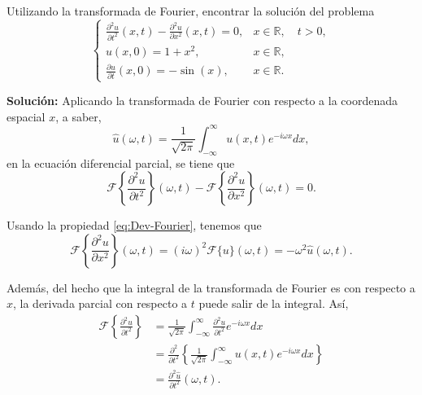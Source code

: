 \begin{ejemplo}
    Utilizando la transformada de Fourier, encontrar la solución del problema
    \begin{equation}
        \left\{ \begin{array}{cl}
           {\displaystyle\frac{\partial^2 u}{\partial t^2}(x,t) - \frac{\partial^2 u}{\partial x^2}(x,t) = 0},  & x \in \mathbb{R}, \quad t > 0,  \\
             u(x,0) = 1 + x^2, & x \in \mathbb{R}, \\
             {\displaystyle\frac{\partial u}{\partial t}(x,0)} = -\sin(x) , & x \in \mathbb{R}.
        \end{array}\right. 
    \end{equation}

    \textbf{Solución:} Aplicando la transformada de Fourier con respecto a la coordenada espacial $x$, a saber,
    \begin{equation}
        \hat{u}(\omega,t) = \frac{1}{\sqrt{2\pi}} \int_{-\infty}^{\infty} u(x,t) e^{-i\omega x} dx,
    \end{equation}
en la ecuación diferencial parcial, se tiene que
\begin{equation}
    \mathcal{F} \left\{ \frac{\partial^2 u}{\partial t^2} \right\}(\omega,t) - \mathcal{F}\left\{  \frac{\partial^2 u}{\partial x^2} \right\}(\omega,t) = 0.  \label{eq:Fourier4} 
\end{equation}

Usando la propiedad \eqref{eq:Dev-Fourier}, tenemos que
\begin{equation}
    \mathcal{F}\left\{\frac{\partial^2 u}{\partial x^2}\right\}(\omega,t) = (i\omega)^2 \mathcal{F}\{u\}(\omega,t) = -\omega^2\hat{u}(\omega,t).
\end{equation}

Además, del hecho que la integral de la transformada de Fourier es con respecto a $x$, la derivada parcial con respecto a $t$ puede salir de la integral. Así,
\begin{align}
    \mathcal{F} \left\{ \frac{\partial^2 u}{\partial t^2} \right\} &= \frac{1}{\sqrt{2\pi}} \int_{-\infty}^{\infty} \frac{\partial^2 u}{\partial t^2} e^{-i\omega x} dx \nonumber \\
    &= \frac{\partial^2}{\partial t^2} \left\{\frac{1}{\sqrt{2\pi}} \int_{-\infty}^{\infty} u(x,t) e^{-i\omega x} dx\right\} \nonumber \\
    &= \frac{\partial^2\hat{u}}{\partial t^2}(\omega,t).
\end{align}


\end{ejemplo}
